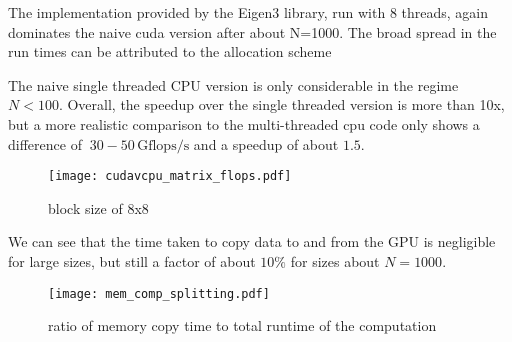 The implementation provided by the Eigen3 library, run with 8 threads, again dominates the naive cuda version after about N=1000. The broad spread in the run times can be attributed to the allocation scheme 

The naive single threaded CPU version is only considerable in the regime $N<100$. 
Overall, the speedup over the single threaded version is more than 10x, but a more realistic comparison to the multi-threaded cpu code only shows a difference of $~30-50 \, \mathrm{Gflops/s}$ and a speedup of about $1.5$.

\begin{figure}[h!]
\texttt{[image: cudavcpu\_matrix\_flops.pdf]}
\caption{block size of 8x8}
\end{figure}

We can see that the time taken to copy data to and from the GPU is negligible for large sizes, but still a factor of about $10\%$ for sizes about $N=1000$. 

\begin{figure}[h!]
    \texttt{[image: mem\_comp\_splitting.pdf]}
    \caption{ratio of memory copy time to total runtime of the computation}
    \end{figure}